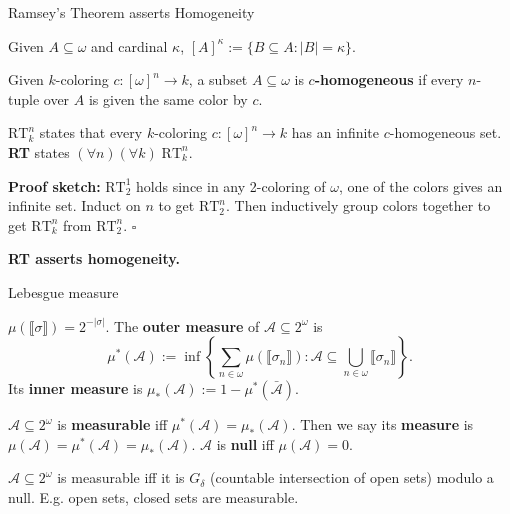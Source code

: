 \begin{frame}{Ramsey's Theorem asserts Homogeneity}
  \begin{notation*}
    Given $A\subseteq\omega$ and cardinal $\kappa$,
    $[A]^\kappa :=\{B\subseteq A:|B|=\kappa\}$.
  \end{notation*}

  \begin{define*}[$c$-homogeneous]
    Given $k$-coloring $c:[\omega]^n\rightarrow k$, a subset
    $A\subseteq\omega$ is \textbf{$c$-homogeneous} if every $n$-tuple over
    $A$ is given the same color by $c$.
  \end{define*}

  \vspace{0.5em}
  \begin{thm*}[Ramsey's]
    \textbf{$\text{RT}_k^n$} states that every $k$-coloring
    $c:[\omega]^n\rightarrow k$ has an infinite $c$-homogeneous set.
    \textbf{RT} states $(\forall n)(\forall k)\; \text{RT}_k^n$.
  \end{thm*}
  \textbf{Proof sketch:} $\text{RT}_2^1$ holds since in any 2-coloring of
  $\omega$, one of the colors gives an infinite set. Induct on $n$ to get
  $\text{RT}_2^n$. Then inductively group colors together to get
  $\text{RT}_k^n$ from $\text{RT}_2^n$. $\square$

  \vspace{0.5em}
  \textbf{RT asserts homogeneity.}
\end{frame}

\begin{frame}{Lebesgue measure}
  \begin{define*}
    $\mu(\llbracket\sigma\rrbracket) =2^{-|\sigma|}$. The \textbf{outer
    measure} of $\mathcal{A}\subseteq2^\omega$ is
    \[\mu^*(\mathcal{A}):= \inf\left\{\sum_{n\in\omega}
    \mu(\llbracket\sigma_n\rrbracket): \mathcal{A}\subseteq
    \bigcup_{n\in\omega} \llbracket\sigma_n\rrbracket\right\}.\]
    Its \textbf{inner measure} is $\mu_*(\mathcal{A}):=
    1-\mu^*(\bar{\mathcal{A}})$.
  \end{define*}

  \begin{define*}
    $\mathcal{A}\subseteq2^\omega$ is \textbf{measurable} iff
    $\mu^*(\mathcal{A}) =\mu_*(\mathcal{A})$.  Then we say its
    \textbf{measure} is $\mu(\mathcal{A}) =\mu^*(\mathcal{A})
    =\mu_*(\mathcal{A})$. $\mathcal{A}$ is \textbf{null} iff
    $\mu(\mathcal{A})=0$.
  \end{define*}
  \begin{fact*}[Measurable]
    $\mathcal{A}\subseteq2^\omega$ is measurable iff it is
    $G_\delta$ (countable intersection of open sets) modulo a null. E.g.
    open sets, closed sets are measurable.
  \end{fact*}
\end{frame}

